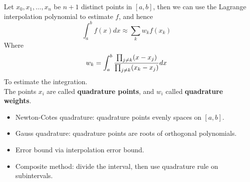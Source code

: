 \documentclass[20pt]{article} %
\theoremstyle{break}
\begin{document}
Let $x_0, x_1, \dots, x_n$ be $n+1$ distinct points in $[a, b]$, then we can use the Lagrange interpolation polynomial to estimate $f$, and hence 
\[\int_a^b f(x)dx\approx \sum_kw_kf(x_k)\]
  Where
  \[w_k=\int_a^b {\prod_{j\not=k}(x-x_j)\over \prod_{j\not=k}(x_k-x_j)} dx\]
To estimate the integration.\\

The points $x_i$ are called {\bf quadrature points}, and $w_i$ called {\bf quadrature weights}. 


\newpage

\begin{itemize}
\item Newton-Cotes quadrature: quadrature points evenly spaces on $[a, b]$.
\item Gauss quadrature: quadrature points are roots of orthogonal polynomials.
\item Error bound via interpolation error bound.
\item Composite method: divide the interval, then use quadrature rule on subintervals.
\end{itemize}
  
\end{document}

